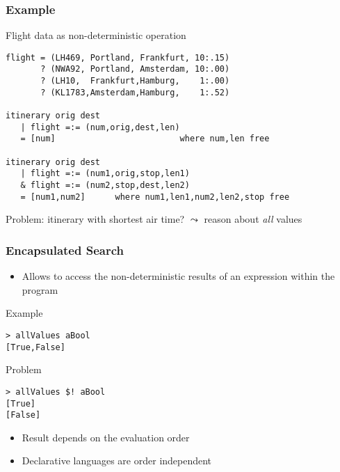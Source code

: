 \documentclass[utf8]{beamer}
\begin{document}
\begin{frame}[fragile]
\frametitle{Example}
\begin{block}{Flight data as non-deterministic operation}
\begin{lstlisting}[mathescape]
flight = (LH469, Portland, Frankfurt, 10:.15)
       ? (NWA92, Portland, Amsterdam, 10:.00)
       ? (LH10,  Frankfurt,Hamburg,    1:.00)
       ? (KL1783,Amsterdam,Hamburg,    1:.52)
       
itinerary orig dest 
   | flight =:= (num,orig,dest,len)
   = [num]                         where num,len free

itinerary orig dest 
   | flight =:= (num1,orig,stop,len1)
   & flight =:= (num2,stop,dest,len2)
   = [num1,num2]      where num1,len1,num2,len2,stop free
\end{lstlisting}
\end{block}
\pause
Problem: itinerary with shortest air time? $\leadsto$ reason about \emph{all} values
\end{frame}

\begin{frame}[fragile]
\frametitle{Encapsulated Search}
\begin{itemize}
\item Allows to access the non-deterministic results of an expression
      within the program
\end{itemize}
\begin{block}{Example}
\begin{lstlisting}
> allValues aBool
[True,False]
\end{lstlisting}
\end{block}
\pause
\begin{block}{Problem}
\begin{lstlisting}
> allValues $! aBool
[True]
[False]
\end{lstlisting}%
\end{block}
\begin{itemize}
\item Result depends on the evaluation order
\item Declarative languages are order independent 
\end{itemize}
\end{frame}
\end{document}
